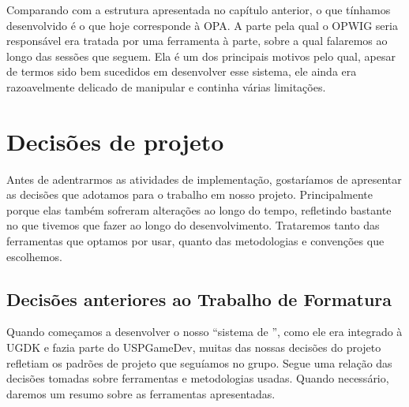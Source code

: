 
    Comparando com a estrutura apresentada no capítulo anterior, o que tínhamos
    desenvolvido é o que hoje corresponde à OPA. A parte pela qual o OPWIG seria
    responsável era tratada por uma ferramenta à parte, sobre a qual falaremos ao
    longo das sessões que seguem. Ela é um dos principais motivos pelo qual, apesar
    de termos sido bem sucedidos em desenvolver esse sistema, ele ainda era
    razoavelmente delicado de manipular e continha várias limitações.

  \section{Decisões de projeto}
  \label{sec:actividads:decisoes}

  Antes de adentrarmos as atividades de implementação, gostaríamos de apresentar
  as decisões que adotamos para o trabalho em nosso projeto. Principalmente
  porque elas também sofreram alterações ao longo do tempo, refletindo bastante
  no que tivemos que fazer ao longo do desenvolvimento. Trataremos tanto das
  ferramentas que optamos por usar, quanto das metodologias e convenções que
  escolhemos.

  \subsection{Decisões anteriores ao Trabalho de Formatura}
  Quando começamos a desenvolver o nosso ``sistema de '',
  como ele era integrado à UGDK e fazia parte do USPGameDev, muitas das
  nossas decisões do projeto refletiam os padrões de projeto que seguíamos
  no grupo. Segue uma relação das decisões tomadas sobre ferramentas e
  metodologias usadas. Quando necessário, daremos um resumo sobre as
  ferramentas apresentadas.

